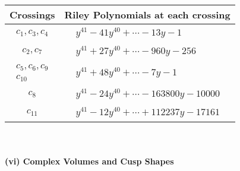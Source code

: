 \documentclass[1p]{elsarticle_modified}
\theoremstyle{definition}
\begin{document}
\begin{tabular}{m{50pt}|m{274pt}}
Crossings & \hspace{64pt}Riley Polynomials at each crossing \\
\hline $$\begin{aligned}c_{1},c_{3},c_{4}\end{aligned}$$&$\begin{aligned}
&y^{41}-41 y^{40}+\cdots-13 y-1
\end{aligned}$\\
\hline $$\begin{aligned}c_{2},c_{7}\end{aligned}$$&$\begin{aligned}
&y^{41}+27 y^{40}+\cdots-960 y-256
\end{aligned}$\\
\hline $$\begin{aligned}c_{5},c_{6},c_{9}\\c_{10}\end{aligned}$$&$\begin{aligned}
&y^{41}+48 y^{40}+\cdots-7 y-1
\end{aligned}$\\
\hline $$\begin{aligned}c_{8}\end{aligned}$$&$\begin{aligned}
&y^{41}-24 y^{40}+\cdots-163800 y-10000
\end{aligned}$\\
\hline $$\begin{aligned}c_{11}\end{aligned}$$&$\begin{aligned}
&y^{41}-12 y^{40}+\cdots+112237 y-17161
\end{aligned}$\\
\hline
\end{tabular}\\~\\
\newpage\flushleft \textbf{(vi) Complex Volumes and Cusp Shapes}
\end{document}
